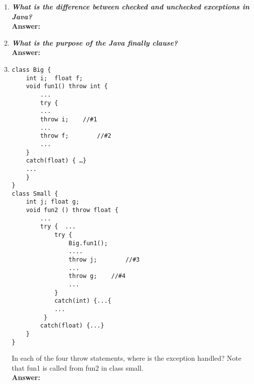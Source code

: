 \documentclass{article}
\begin{document}
\begin{enumerate}
\item 
\textbf{\textit{What is the difference between checked and unchecked exceptions in Java?}}\\
\textbf{Answer: }

\item 
\textbf{\textit{What is the purpose of the Java finally clause?}}\\
\textbf{Answer: }

\item 
\begin{lstlisting}
class Big {
	int i;  float f;
	void fun1() throw int { 
		...
		try {
		...
		throw i;  	//#1
		...
		throw f;		//#2
		...
	}
	catch(float) { …}
	...
	}
}
class Small {
 	int j; float g;
	void fun2 () throw float {
		...
		try {  ...
			try {
				Big.fun1();
				....
				throw j;		//#3
				...
				throw g;	//#4
				...
			}
			catch(int) {...{
			...
		 }
		catch(float) {...}
	}
}
\end{lstlisting}
In each of the four throw statements, where is the exception handled? Note that fun1 is called from fun2 in class small.\\
\textbf{Answer: }
\end{enumerate}
\end{document}
